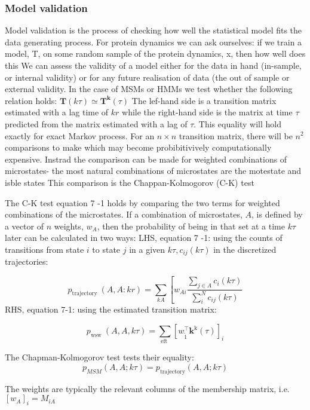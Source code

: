 \subsubsection{Model validation}

Model validation is the process of checking how well the statistical model fits the data generating process. For protein dynamics we can ask ourselves: if we train a model, T, on some random sample of the protein dynamics, x, then how well does this We can assess the validity of a model either for the data in hand (in-sample, or internal validity) or for any future realisation of data (the out of sample or external validity. In the case of MSMs or HMMs we test whether the following relation holds:
$\mathbf{T}(k \tau) \simeq \mathbf{T}^{\mathbf{k}}(\tau)$
The lef-hand side is a transition matrix estimated with a lag time of $k r$ while the right-hand side is the matrix at time $\tau$ predicted from the matrix estimated with a lag of $\tau$. This equality will hold exactly for exact Markov process. For an $n \times n$ transition matrix, there will be $n^{2}$ comparisons to make which may become probibitivively computationally expensive. Instrad the comparison can be made for weighted combinations of microstates- the most natural combinations of microstates are the motestate and isble states This comparison is the Chappan-Kolmogorov (C-K) test

The C-K test equation 7 -1 holds by comparing the two terms for weighted combinations of the microstates. If a combination of microstates, $A$, is defined by a vector of $n$ weights, $w_{A}$, then the probability of being in that set at a time $k \tau$ later can be calculated in two ways:
LHS, equation 7 -1: using the counts of transitions from state $i$ to state $j$ in a given $k \tau, c_{i j}(k \tau)$ in the discretized trajectories:

\begin{equation}
p_{\text {trajectory }}(A, A: k r)=\sum_{k A}\left[w_{A i} \frac{\sum_{j \in A} c_{i}(k \tau)}{\sum_{i}^{N} c_{i j}(k \tau)}\right.
\end{equation}
RHS, equation 7-1: using the estimated transition matrix:

\begin{equation}
p_{\text {wsw }}(A, A, k \tau)=\sum_{\text {eft }}\left[w_{\tilde{1}}^{\top} \mathbf{k}^{\mathrm{k}}(\tau)\right]_{i}
\end{equation}

The Chapman-Kolmogorov test tests their equality:
\begin{equation}\label{eqn:ck_test}
p_{M S M}(A, A ; k \tau)=p_{\text {trajectory}}(A, A ; k \tau)
\end{equation}

The weights are typically the relevant columns of the membership matrix, i.e. $\left[w_{A}\right]_{i}=M_{i A}$
